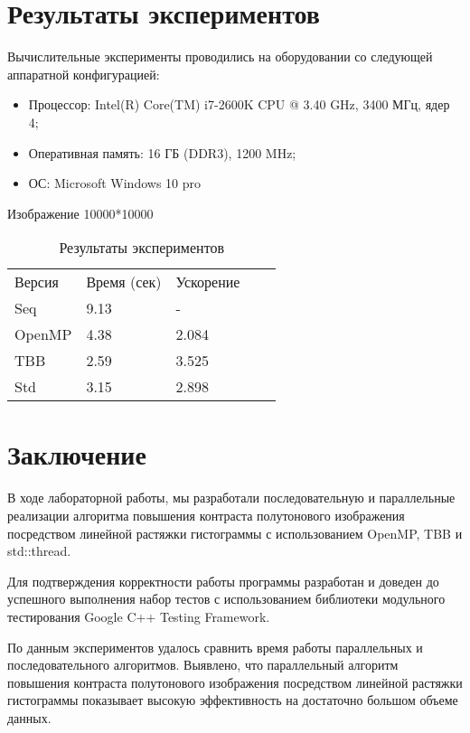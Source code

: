 \documentclass{report}
\begin{document}
\section*{Результаты экспериментов}
Вычислительные эксперименты проводились на оборудовании со следующей аппаратной конфигурацией:
\begin{itemize}
\item Процессор: Intel(R) Core(TM) i7-2600K CPU @ 3.40 GHz, 3400 МГц, ядер 4;
\item Оперативная память: 16 ГБ (DDR3), 1200 MHz;
\item ОС: Microsoft Windows 10 pro 
\end{itemize}
\par Изображение 10000*10000
\\
\begin{table}[!h]
\centering
\begin{tabular}{lllll}
Версия & Время (сек) & Ускорение  \\
Seq   & 9.13 & -  \\
OpenMP  & 4.38 & 2.084  \\
TBB  & 2.59 & 3.525  \\
Std  & 3.15 & 2.898  \\
\end{tabular}
\caption{Результаты экспериментов}
\end{table}

\newpage

\section*{Заключение}
\par В ходе лабораторной работы, мы разработали последовательную и параллельные реализации алгоритма повышения контраста полутонового изображения посредством линейной растяжки гистограммы с использованием  OpenMP, TBB и std::thread.
\par Для подтверждения корректности работы программы разработан и доведен до успешного
выполнения набор тестов с использованием библиотеки модульного тестирования Google C++
Testing Framework.
\par По данным экспериментов удалось сравнить время работы параллельных и последовательного
алгоритмов. Выявлено, что параллельный алгоритм повышения контраста полутонового изображения посредством линейной растяжки гистограммы показывает высокую эффективность на достаточно большом объеме данных.
\newpage
\end{document}

